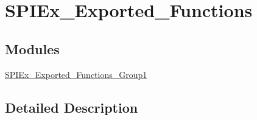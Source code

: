 \hypertarget{group___s_p_i_ex___exported___functions}{}\section{S\+P\+I\+Ex\+\_\+\+Exported\+\_\+\+Functions}
\label{group___s_p_i_ex___exported___functions}
\subsection*{Modules}
\begin{DoxyCompactItemize}
\item 
\mbox{\hyperlink{group___s_p_i_ex___exported___functions___group1}{S\+P\+I\+Ex\+\_\+\+Exported\+\_\+\+Functions\+\_\+\+Group1}}
\end{DoxyCompactItemize}


\subsection{Detailed Description}
